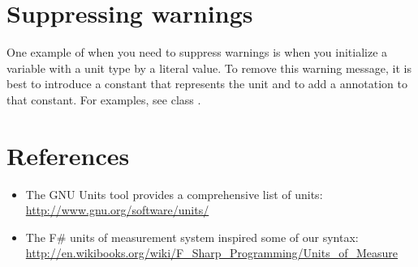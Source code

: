 \section{Suppressing warnings\label{units-suppressing}}

One example of when you need to suppress warnings is when you
initialize a variable with a unit type by a literal value.
To remove this warning message, it is best to introduce a
constant that represents the unit and to
add a 
annotation to that constant.
For examples, see class .


\section{References\label{units-references}}

\begin{itemize}
\item The GNU Units tool provides a comprehensive list of units:\\
  \url{http://www.gnu.org/software/units/}

\item The F\# units of measurement system inspired some of our syntax:\\
  \url{http://en.wikibooks.org/wiki/F_Sharp_Programming/Units_of_Measure}

\end{itemize}

